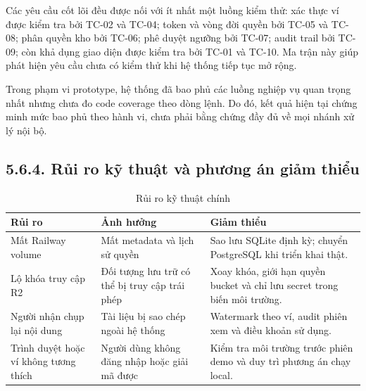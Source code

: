 Các yêu cầu cốt lõi đều được nối với ít nhất một luồng kiểm thử: xác thực ví được kiểm tra bởi TC-02 và TC-04; token và vòng đời quyền bởi TC-05 và TC-08; phân quyền kho bởi TC-06; phê duyệt ngưỡng bởi TC-07; audit trail bởi TC-09; còn khả dụng giao diện được kiểm tra bởi TC-01 và TC-10. Ma trận này giúp phát hiện yêu cầu chưa có kiểm thử khi hệ thống tiếp tục mở rộng.

Trong phạm vi prototype, hệ thống đã bao phủ các luồng nghiệp vụ quan trọng nhất nhưng chưa đo code coverage theo dòng lệnh. Do đó, kết quả hiện tại chứng minh mức bao phủ theo hành vi, chưa phải bằng chứng đầy đủ về mọi nhánh xử lý nội bộ.

\subsection*{5.6.4. Rủi ro kỹ thuật và phương án giảm thiểu}
{}

\begin{longtable}{|p{4.2cm}|p{4cm}|p{5cm}|}
\caption{Rủi ro kỹ thuật chính} \\
\hline
\textbf{Rủi ro} & \textbf{Ảnh hưởng} & \textbf{Giảm thiểu} \\ \hline
Mất Railway volume & Mất metadata và lịch sử quyền & Sao lưu SQLite định kỳ; chuyển PostgreSQL khi triển khai thật. \\ \hline
Lộ khóa truy cập R2 & Đối tượng lưu trữ có thể bị truy cập trái phép & Xoay khóa, giới hạn quyền bucket và chỉ lưu secret trong biến môi trường. \\ \hline
Người nhận chụp lại nội dung & Tài liệu bị sao chép ngoài hệ thống & Watermark theo ví, audit phiên xem và điều khoản sử dụng. \\ \hline
Trình duyệt hoặc ví không tương thích & Người dùng không đăng nhập hoặc giải mã được & Kiểm tra môi trường trước phiên demo và duy trì phương án chạy local. \\ \hline
\end{longtable}

\clearpage
